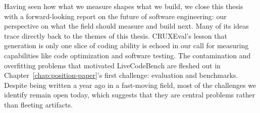 Having seen how what we measure shapes what we build, we close this thesis with a forward-looking report
on the future of software engineering: our perspective on what the field should measure and build next.
Many of its ideas trace directly back to the themes of this thesis. CRUXEval's lesson that generation is only one slice of coding ability
is echoed in our call for measuring capabilities like code optimization and software testing. The contamination and overfitting problems that
motivated LiveCodeBench are fleshed out in Chapter~\ref{chap:position-paper}'s first challenge: evaluation and benchmarks.
Despite being written a year ago in a fast-moving field, most of the challenges we identify remain open today,
which suggests that they are central problems rather than fleeting artifacts.
